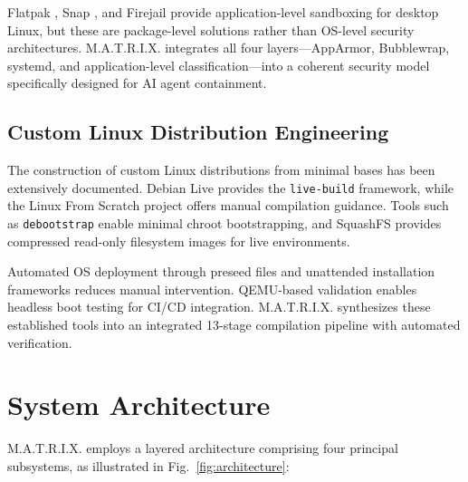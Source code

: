 \documentclass[conference]{IEEEtran}
\begin{document}
Flatpak \cite{flatpak2024}, Snap \cite{snap2024}, and Firejail \cite{firejail2024} provide application-level sandboxing for desktop Linux, but these are package-level solutions rather than OS-level security architectures. M.A.T.R.I.X. integrates all four layers---AppArmor, Bubblewrap, systemd, and application-level classification---into a coherent security model specifically designed for AI agent containment.

\subsection{Custom Linux Distribution Engineering}

The construction of custom Linux distributions from minimal bases has been extensively documented. Debian Live \cite{debianlive2024} provides the \texttt{live-build} framework, while the Linux From Scratch project \cite{lfs2024} offers manual compilation guidance. Tools such as \texttt{debootstrap} \cite{debootstrap2024} enable minimal chroot bootstrapping, and SquashFS \cite{squashfs2024} provides compressed read-only filesystem images for live environments.

Automated OS deployment through preseed files \cite{debianpreseed2024} and unattended installation frameworks reduces manual intervention. QEMU-based validation \cite{qemu2024} enables headless boot testing for CI/CD integration. M.A.T.R.I.X. synthesizes these established tools into an integrated 13-stage compilation pipeline with automated verification.


\section{System Architecture}
\label{sec:architecture}

M.A.T.R.I.X. employs a layered architecture comprising four principal subsystems, as illustrated in Fig.~\ref{fig:architecture}:
\end{document}
